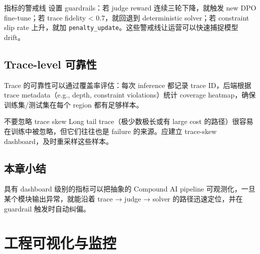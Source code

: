 \documentclass[a4paper]{article}
\begin{document}
\begin{knowledgebox}{指标的警戒线}
设置 guardrails：若 judge reward 连续三轮下降，就触发 new DPO fine-tune；若 trace fidelity < 0.7，就回退到 deterministic solver；若 constraint slip rate 上升，就加 \texttt{penalty\_update}。这些警戒线让运营可以快速捕捉模型 drift。
\end{knowledgebox}

\subsection{Trace-level 可靠性}

Trace 的可靠性可以通过覆盖率评估：每次 inference 都记录 trace ID，后端根据 trace metadata（e.g., depth, constraint violations）统计 coverage heatmap，确保训练集/测试集在每个 region 都有足够样本。

\begin{warningbox}{不要忽略 trace skew}
Long tail trace（极少数极长或有 large cost 的路径）很容易在训练中被忽略，但它们往往也是 failure 的来源。应建立 trace-skew dashboard，及时重采样这些样本。
\end{warningbox}

\subsection{本章小结}

具有 dashboard 级别的指标可以把抽象的 Compound AI pipeline 可观测化，一旦某个模块输出异常，就能沿着 trace → judge → solver 的路径迅速定位，并在 guardrail 触发时自动纠偏。

\section{工程可视化与监控}
\end{document}
